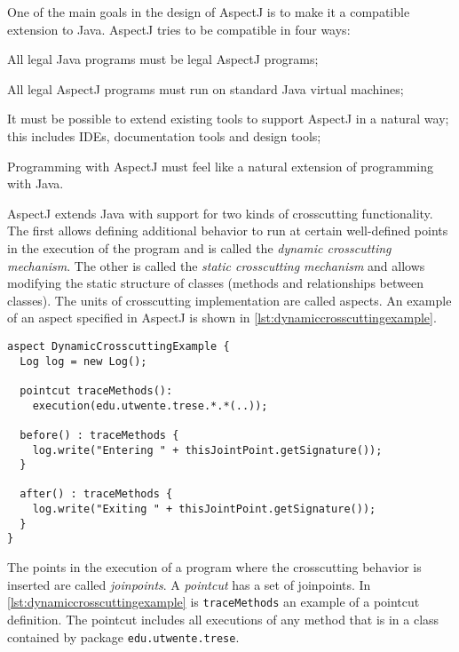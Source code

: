 One of the main goals in the design of AspectJ is to make it a compatible extension to Java.
AspectJ tries to be compatible in four ways:
\begin{description}[style=nextline,noitemsep]
  \item[Upward compatibility] All legal Java programs must be legal AspectJ programs;
  \item[Platform compatibility] All legal AspectJ programs must run on standard Java virtual machines;
  \item[Tool compatibility] It must be possible to extend existing tools to support AspectJ in a natural way; this includes IDEs, documentation tools and design tools;
  \item[Programmer compatibility] Programming with AspectJ must feel like a natural extension of programming with Java.
\end{description}

AspectJ extends Java with support for two kinds of crosscutting functionality.
The first allows defining additional behavior to run at certain well-defined points in the execution of the program and is called the \emph{dynamic crosscutting mechanism}.
The other is called the \emph{static crosscutting mechanism} and allows modifying the static structure of classes (methods and relationships between classes).
The units of crosscutting implementation are called aspects.
An example of an aspect specified in AspectJ is shown in \autoref{lst:dynamiccrosscuttingexample}.

\begin{lstlisting}[language={[AspectJ]Java},style=floatlisting,%
                   caption={Example of dynamic crosscutting in AspectJ},%
                   label={lst:dynamiccrosscuttingexample}]
aspect DynamicCrosscuttingExample {
  Log log = new Log();

  pointcut traceMethods():
    execution(edu.utwente.trese.*.*(..));

  before() : traceMethods {
    log.write("Entering " + thisJointPoint.getSignature());
  }

  after() : traceMethods {
    log.write("Exiting " + thisJointPoint.getSignature());
  }
}
\end{lstlisting}

The points in the execution of a program where the crosscutting behavior is inserted are called \emph{joinpoints}.
A \emph{pointcut} has a set of joinpoints.
In \autoref{lst:dynamiccrosscuttingexample} is \lstinline|traceMethods| an example of a pointcut definition.
The pointcut includes all executions of any method that is in a class contained by package \lstinline|edu.utwente.trese|.


